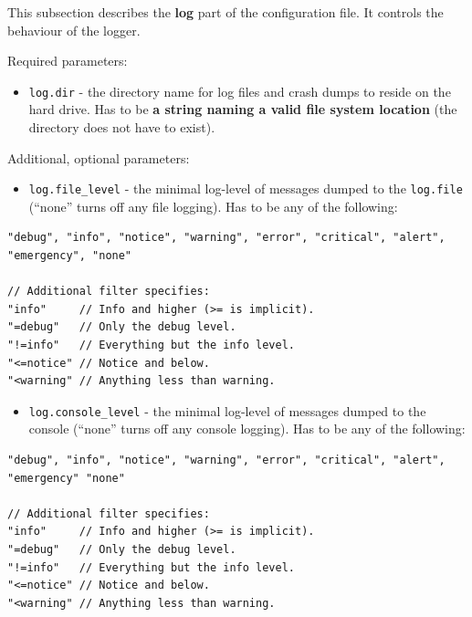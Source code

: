 \documentclass[a4paper]{article}
\begin{document}
This subsection describes the \textbf{log} part of the configuration file. It controls the behaviour of the logger.

\noindent
Required parameters:

\begin{itemize}
\item \texttt{log.dir} - the directory name for log files and crash dumps to reside on the hard drive. Has to be \textbf{a string naming a valid file system location} (the directory does not have to exist).
\end{itemize}

\noindent
Additional, optional parameters:

\begin{itemize}
\item \texttt{log.file\_level} - the minimal log-level of messages dumped to the \texttt{log.file} (``none'' turns off any file logging). Has to be any of the following:
\end{itemize}


\begin{verbatim}
"debug", "info", "notice", "warning", "error", "critical", "alert", "emergency", "none"

// Additional filter specifies:
"info"     // Info and higher (>= is implicit).
"=debug"   // Only the debug level.
"!=info"   // Everything but the info level.
"<=notice" // Notice and below.
"<warning" // Anything less than warning.
\end{verbatim}





\begin{itemize}
\item \texttt{log.console\_level} - the minimal log-level of messages dumped to the console (``none'' turns off any console logging). Has to be any of the following:
\end{itemize}


\begin{verbatim}
"debug", "info", "notice", "warning", "error", "critical", "alert", "emergency" "none"

// Additional filter specifies:
"info"     // Info and higher (>= is implicit).
"=debug"   // Only the debug level.
"!=info"   // Everything but the info level.
"<=notice" // Notice and below.
"<warning" // Anything less than warning.
\end{verbatim}
\end{document}
